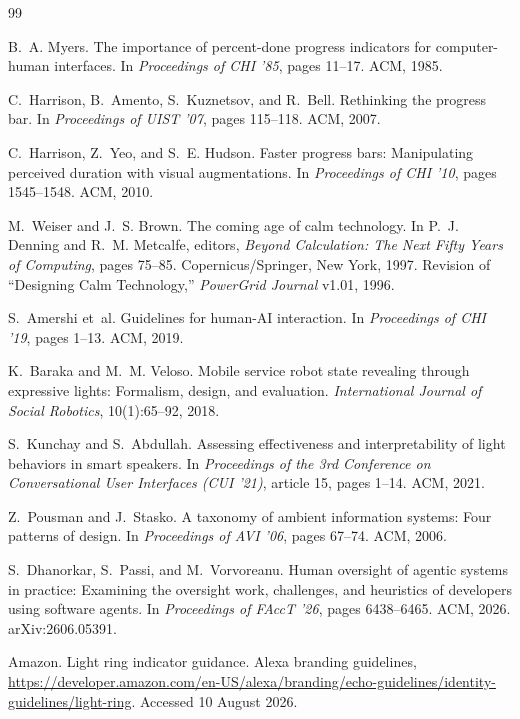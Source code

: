 \documentclass[11pt]{article}
\begin{document}
\begin{thebibliography}{99}

B.~A. Myers.
The importance of percent-done progress indicators for computer-human
interfaces.
In \emph{Proceedings of CHI '85}, pages 11--17. ACM, 1985.

C.~Harrison, B.~Amento, S.~Kuznetsov, and R.~Bell.
Rethinking the progress bar.
In \emph{Proceedings of UIST '07}, pages 115--118. ACM, 2007.

C.~Harrison, Z.~Yeo, and S.~E. Hudson.
Faster progress bars: Manipulating perceived duration with visual
augmentations.
In \emph{Proceedings of CHI '10}, pages 1545--1548. ACM, 2010.

M.~Weiser and J.~S. Brown.
The coming age of calm technology.
In P.~J. Denning and R.~M. Metcalfe, editors, \emph{Beyond Calculation:
The Next Fifty Years of Computing}, pages 75--85. Copernicus/Springer,
New York, 1997.
Revision of ``Designing Calm Technology,'' \emph{PowerGrid Journal}
v1.01, 1996.

S.~Amershi et~al.
Guidelines for human-AI interaction.
In \emph{Proceedings of CHI '19}, pages 1--13. ACM, 2019.

K.~Baraka and M.~M. Veloso.
Mobile service robot state revealing through expressive lights:
Formalism, design, and evaluation.
\emph{International Journal of Social Robotics}, 10(1):65--92, 2018.

S.~Kunchay and S.~Abdullah.
Assessing effectiveness and interpretability of light behaviors in smart
speakers.
In \emph{Proceedings of the 3rd Conference on Conversational User
Interfaces (CUI '21)}, article 15, pages 1--14. ACM, 2021.

Z.~Pousman and J.~Stasko.
A taxonomy of ambient information systems: Four patterns of design.
In \emph{Proceedings of AVI '06}, pages 67--74. ACM, 2006.

S.~Dhanorkar, S.~Passi, and M.~Vorvoreanu.
Human oversight of agentic systems in practice: Examining the oversight
work, challenges, and heuristics of developers using software agents.
In \emph{Proceedings of FAccT '26}, pages 6438--6465. ACM, 2026.
arXiv:2606.05391.

Amazon.
Light ring indicator guidance.
Alexa branding guidelines,
\url{https://developer.amazon.com/en-US/alexa/branding/echo-guidelines/identity-guidelines/light-ring}.
Accessed 10 August 2026.


\end{thebibliography}
\end{document}
